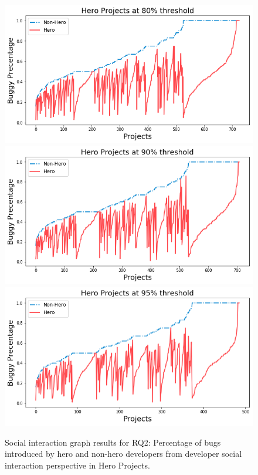 \documentclass[smallextended]{svjour3}
\begin{document}
\begin{figure}[]\begin{center}
\includegraphics[width=.7\linewidth]{80_Social.png}
\includegraphics[width=.7\linewidth]{90_Social.png}
\includegraphics[width=.7\linewidth]{95_Social.png}
\end{center}
\caption{Social interaction  graph results for
RQ2: Percentage of bugs introduced by hero and non-hero developers from developer social interaction perspective in Hero Projects.}
\label{fig:RQ2_social}
\end{figure}
\end{document}
